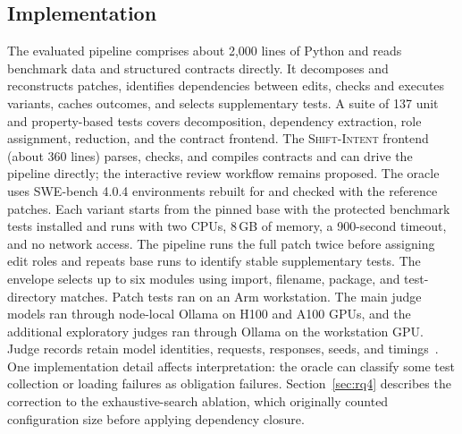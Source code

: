 \documentclass[a4paper,fleqn]{cas-sc}
\newcommand{\dsl}{\textsc{Shift-Intent}}
\newcommand{\code}[1]{\texttt{\detokenize{#1}}}
\begin{document}
\subsection{Implementation}\label{sec:implementation}

The evaluated pipeline comprises about 2,000 lines of Python and reads benchmark data and structured contracts directly. It decomposes and reconstructs patches, identifies dependencies between edits, checks and executes variants, caches outcomes, and selects supplementary tests. A suite of 137 unit and property-based tests covers decomposition, dependency extraction, role assignment, reduction, and the contract frontend. The \dsl{} frontend (about 360 lines) parses, checks, and compiles contracts and can drive the pipeline directly; the interactive review workflow remains proposed. The oracle uses SWE-bench 4.0.4 environments rebuilt for \code{linux/arm64} and checked with the reference patches. Each variant starts from the pinned base with the protected benchmark tests installed and runs with two CPUs, 8\,GB of memory, a 900-second timeout, and no network access. The pipeline runs the full patch twice before assigning edit roles and repeats base runs to identify stable supplementary tests. The envelope selects up to six modules using import, filename, package, and test-directory matches. Patch tests ran on an Arm workstation. The main judge models ran through node-local Ollama on H100 and A100 GPUs, and the additional exploratory judges ran through Ollama on the workstation GPU. Judge records retain model identities, requests, responses, seeds, and timings~\citep{baltes2027guidelines}. One implementation detail affects interpretation: the oracle can classify some test collection or loading failures as obligation failures. Section~\ref{sec:rq4} describes the correction to the exhaustive-search ablation, which originally counted configuration size before applying dependency closure.


\end{document}
